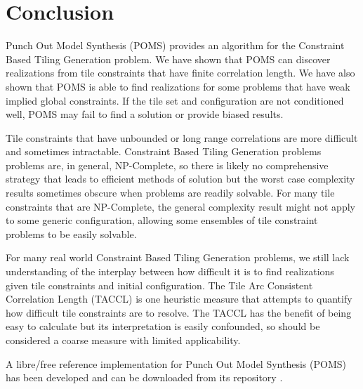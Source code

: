 \section{Conclusion}

Punch Out Model Synthesis (POMS) provides an algorithm for the Constraint Based Tiling Generation problem.
We have shown that POMS can discover realizations from tile constraints that have finite correlation length.
We have also shown that POMS is able to find realizations for some problems
that have weak implied global constraints.
If the tile set and configuration are not conditioned well,
POMS may fail to find a solution or provide biased results.

Tile constraints that have unbounded or long range correlations are more difficult and sometimes intractable.
Constraint Based Tiling Generation problems problems are, in general, NP-Complete, so there is likely
no comprehensive strategy that leads to efficient methods of solution but the worst case complexity
results sometimes obscure when problems are readily solvable.
For many tile constraints that are NP-Complete, the general complexity result might not
apply to some generic configuration, allowing some ensembles of tile constraint problems
to be easily solvable.

For many real world Constraint Based Tiling Generation problems, we still lack understanding of the
interplay between how difficult it is to find realizations given tile constraints
and initial configuration.
The Tile Arc Consistent Correlation Length (TACCL) is one heuristic measure that attempts
to quantify how difficult tile constraints are to resolve.
The TACCL has the benefit of being easy to calculate but its interpretation is easily confounded,
so should be considered a coarse measure with limited applicability.

A libre/free reference implementation for Punch Out Model Synthesis (POMS) has been developed and can be downloaded
from its repository .

